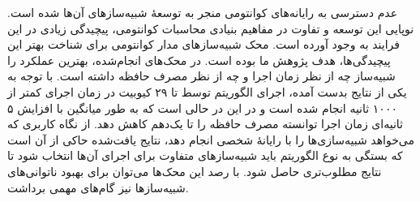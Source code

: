 عدم دسترسی به رایانه‌های کوانتومی منجر به توسعهٔ شبیه‌سازهای آن‌ها شده است. نوپایی این توسعه و تفاوت در مفاهیم بنیادی محاسبات کوانتومی، پیچیدگی زیادی در این فرایند به وجود آورده است. محک شبیه‌سازهای مدار کوانتومی برای شناخت بهتر این پیچیدگی‌ها، هدف پژوهش ما بوده است. در محک‌های انجام‌شده، بهترین عملکرد را شبیه‌ساز
چه از نظر زمان اجرا و چه از نظر مصرف حافظه داشته است. با توجه به یکی از نتایج بدست آمده، اجرای الگوریتم
توسط
تا ۲۹ کیوبیت در زمان اجرای کمتر از ۱۰۰۰ ثانیه انجام شده است و در این در حالی است که
به طور میانگین با افزایش ۵ ثانیه‌ای زمان اجرا توانسته مصرف حافظه را تا یک‌دهم کاهش دهد. از نگاه کاربری که می‌خواهد شبیه‌سازی‌ها را با رایانهٔ شخصی انجام دهد، نتایج یافت‌شده حاکی از آن است که بستگی به نوع الگوریتم باید شبیه‌سازهای متفاوت برای اجرای آن‌ها انتخاب شود تا نتایج مطلوب‌تری حاصل شود. با رصد این محک‌ها می‌توان برای بهبود ناتوانی‌های شبیه‌سازها نیز گام‌های مهمی برداشت.
